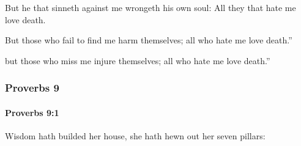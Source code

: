 			\begin{versebox}
					\item[BHS] 
					\item[ASV] But he that sinneth against me wrongeth his own soul: All they that hate me love death.
					\item[NIV] But those who fail to find me harm themselves; all who hate me love death.”
					\item[NRSV] but those who miss me injure themselves; all who hate me love death.”
			\end{versebox}
	\subsubsection{Proverbs 9} %
		\label{PROVERBS-9}

		\paragraph{Proverbs 9:1} %
			\label{PROVERBS-9-1}

			Wisdom hath builded her house, she hath hewn out her seven pillars:

